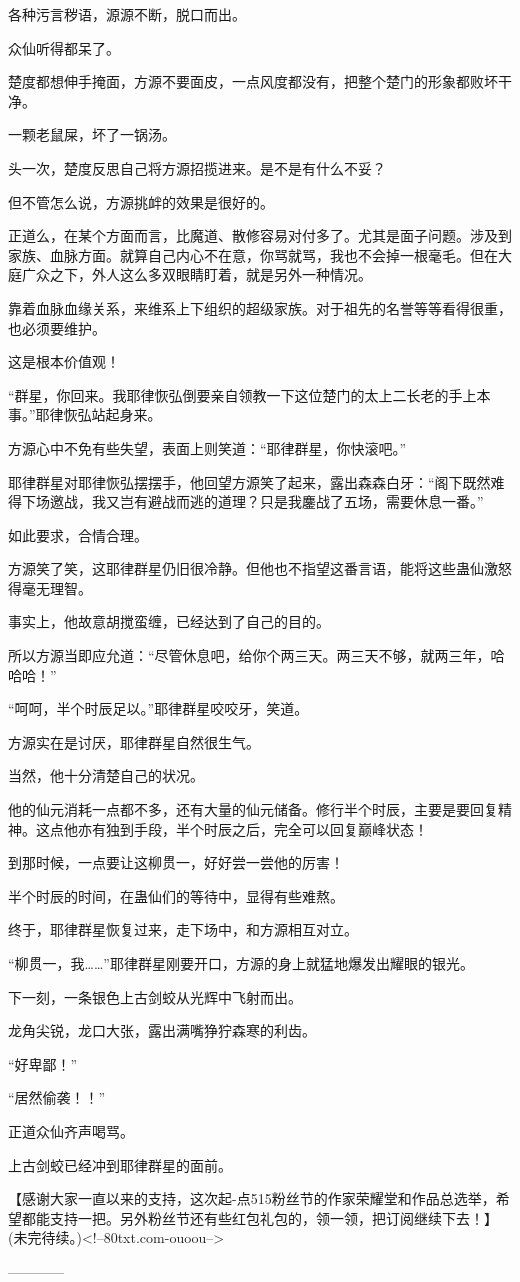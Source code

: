 \begin{this_body}
各种污言秽语，源源不断，脱口而出。

众仙听得都呆了。

楚度都想伸手掩面，方源不要面皮，一点风度都没有，把整个楚门的形象都败坏干净。

一颗老鼠屎，坏了一锅汤。

头一次，楚度反思自己将方源招揽进来。是不是有什么不妥？

但不管怎么说，方源挑衅的效果是很好的。

正道么，在某个方面而言，比魔道、散修容易对付多了。尤其是面子问题。涉及到家族、血脉方面。就算自己内心不在意，你骂就骂，我也不会掉一根毫毛。但在大庭广众之下，外人这么多双眼睛盯着，就是另外一种情况。

靠着血脉血缘关系，来维系上下组织的超级家族。对于祖先的名誉等等看得很重，也必须要维护。

这是根本价值观！

“群星，你回来。我耶律恢弘倒要亲自领教一下这位楚门的太上二长老的手上本事。”耶律恢弘站起身来。

方源心中不免有些失望，表面上则笑道：“耶律群星，你快滚吧。”

耶律群星对耶律恢弘摆摆手，他回望方源笑了起来，露出森森白牙：“阁下既然难得下场邀战，我又岂有避战而逃的道理？只是我鏖战了五场，需要休息一番。”

如此要求，合情合理。

方源笑了笑，这耶律群星仍旧很冷静。但他也不指望这番言语，能将这些蛊仙激怒得毫无理智。

事实上，他故意胡搅蛮缠，已经达到了自己的目的。

所以方源当即应允道：“尽管休息吧，给你个两三天。两三天不够，就两三年，哈哈哈！”

“呵呵，半个时辰足以。”耶律群星咬咬牙，笑道。

方源实在是讨厌，耶律群星自然很生气。

当然，他十分清楚自己的状况。

他的仙元消耗一点都不多，还有大量的仙元储备。修行半个时辰，主要是要回复精神。这点他亦有独到手段，半个时辰之后，完全可以回复巅峰状态！

到那时候，一点要让这柳贯一，好好尝一尝他的厉害！

半个时辰的时间，在蛊仙们的等待中，显得有些难熬。

终于，耶律群星恢复过来，走下场中，和方源相互对立。

“柳贯一，我……”耶律群星刚要开口，方源的身上就猛地爆发出耀眼的银光。

下一刻，一条银色上古剑蛟从光辉中飞射而出。

龙角尖锐，龙口大张，露出满嘴狰狞森寒的利齿。

“好卑鄙！”

“居然偷袭！！”

正道众仙齐声喝骂。

上古剑蛟已经冲到耶律群星的面前。

【感谢大家一直以来的支持，这次起-点515粉丝节的作家荣耀堂和作品总选举，希望都能支持一把。另外粉丝节还有些红包礼包的，领一领，把订阅继续下去！】(未完待续。)<!--80txt.com-ouoou-->

------------

\end{this_body}

